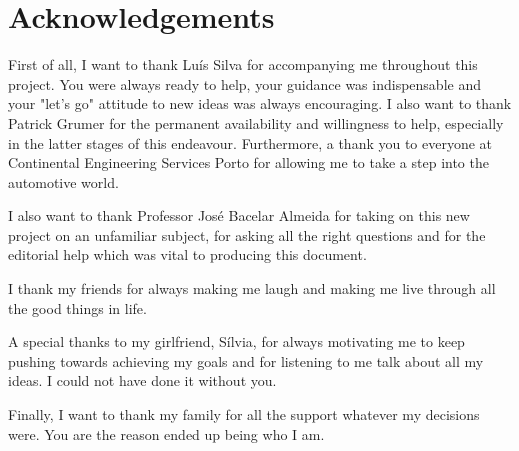 \chapter*{Acknowledgements}

First of all, I want to thank Luís Silva for accompanying me throughout this project. You were always ready to help, your guidance was indispensable and your "let's go" attitude to new ideas was always encouraging. I also want to thank Patrick Grumer for the permanent availability and willingness to help, especially in the latter stages of this endeavour. Furthermore, a thank you to everyone at Continental Engineering Services Porto for allowing me to take a step into the automotive world.\par

I also want to thank Professor José Bacelar Almeida for taking on this new project on an unfamiliar subject, for asking all the right questions and for the editorial help which was vital to producing this document.\par

I thank my friends for always making me laugh and making me live through all the good things in life.

A special thanks to my girlfriend, Sílvia, for always motivating me to keep pushing towards achieving my goals and for listening to me talk about all my ideas. I could not have done it without you.\par

Finally, I want to thank my family for all the support whatever my decisions were. You are the reason ended up being who I am.
